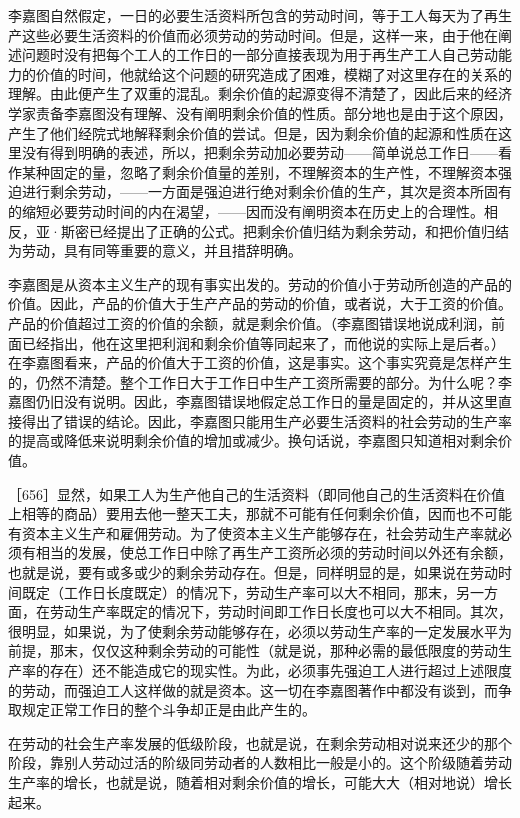 李嘉图自然假定，一日的必要生活资料所包含的劳动时间，等于工人每天为了再生产这些必要生活资料的价值而必须劳动的劳动时间。但是，这样一来，由于他在阐述问题时没有把每个工人的工作日的一部分直接表现为用于再生产工人自己劳动能力的价值的时间，他就给这个问题的研究造成了困难，模糊了对这里存在的关系的理解。由此便产生了双重的混乱。剩余价值的起源变得不清楚了，因此后来的经济学家责备李嘉图没有理解、没有阐明剩余价值的性质。部分地也是由于这个原因，产生了他们经院式地解释剩余价值的尝试。但是，因为剩余价值的起源和性质在这里没有得到明确的表述，所以，把剩余劳动加必要劳动——简单说总工作日——看作某种固定的量，忽略了剩余价值量的差别，不理解资本的生产性，不理解资本强迫进行剩余劳动，——一方面是强迫进行绝对剩余价值的生产，其次是资本所固有的缩短必要劳动时间的内在渴望，——因而没有阐明资本在历史上的合理性。相反，亚·斯密已经提出了正确的公式。把剩余价值归结为剩余劳动，和把价值归结为劳动，具有同等重要的意义，并且措辞明确。

李嘉图是从资本主义生产的现有事实出发的。劳动的价值小于劳动所创造的产品的价值。因此，产品的价值大于生产产品的劳动的价值，或者说，大于工资的价值。产品的价值超过工资的价值的余额，就是剩余价值。（李嘉图错误地说成利润，前面已经指出，他在这里把利润和剩余价值等同起来了，而他说的实际上是后者。）在李嘉图看来，产品的价值大于工资的价值，这是事实。这个事实究竟是怎样产生的，仍然不清楚。整个工作日大于工作日中生产工资所需要的部分。为什么呢？李嘉图仍旧没有说明。因此，李嘉图错误地假定总工作日的量是固定的，并从这里直接得出了错误的结论。因此，李嘉图只能用生产必要生活资料的社会劳动的生产率的提高或降低来说明剩余价值的增加或减少。换句话说，李嘉图只知道相对剩余价值。

［656］显然，如果工人为生产他自己的生活资料（即同他自己的生活资料在价值上相等的商品）要用去他一整天工夫，那就不可能有任何剩余价值，因而也不可能有资本主义生产和雇佣劳动。为了使资本主义生产能够存在，社会劳动生产率就必须有相当的发展，使总工作日中除了再生产工资所必须的劳动时间以外还有余额，也就是说，要有或多或少的剩余劳动存在。但是，同样明显的是，如果说在劳动时间既定（工作日长度既定）的情况下，劳动生产率可以大不相同，那末，另一方面，在劳动生产率既定的情况下，劳动时间即工作日长度也可以大不相同。其次，很明显，如果说，为了使剩余劳动能够存在，必须以劳动生产率的一定发展水平为前提，那末，仅仅这种剩余劳动的可能性（就是说，那种必需的最低限度的劳动生产率的存在）还不能造成它的现实性。为此，必须事先强迫工人进行超过上述限度的劳动，而强迫工人这样做的就是资本。这一切在李嘉图著作中都没有谈到，而争取规定正常工作日的整个斗争却正是由此产生的。

在劳动的社会生产率发展的低级阶段，也就是说，在剩余劳动相对说来还少的那个阶段，靠别人劳动过活的阶级同劳动者的人数相比一般是小的。这个阶级随着劳动生产率的增长，也就是说，随着相对剩余价值的增长，可能大大（相对地说）增长起来。

